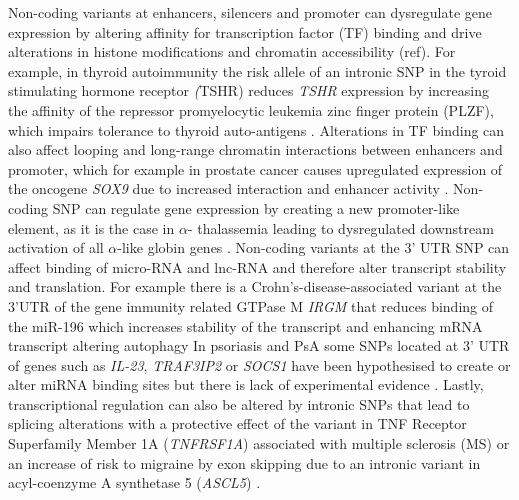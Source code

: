 Non-coding variants at enhancers, silencers and promoter can dysregulate gene expression by altering affinity for transcription factor (TF) binding  and drive alterations in histone modifications and chromatin accessibility (ref). For example, in thyroid autoimmunity the risk allele of an intronic SNP in the tyroid stimulating hormone receptor \textit(TSHR) reduces \textit{TSHR} expression by increasing the affinity of the repressor promyelocytic leukemia zinc finger protein (PLZF), which impairs tolerance to thyroid auto-antigens \parencite{Stefan2014}. Alterations in TF binding can also affect looping and long-range chromatin interactions between enhancers and promoter, which for example in prostate cancer causes upregulated expression of the oncogene \textit{SOX9} due to increased interaction and enhancer activity \parencite{Zhang2012}. Non-coding SNP can regulate gene expression by creating a new promoter-like element, as it is the case in $\alpha$- thalassemia leading to  dysregulated downstream activation of all $\alpha$-like globin genes \parencite{Gobbi2006}. 
Non-coding variants at the 3' UTR SNP can affect binding of micro-RNA and lnc-RNA and therefore alter transcript stability and translation. For example  there is a Crohn’s-disease-associated variant at the 3'UTR of the gene immunity related GTPase M \textit{IRGM} that reduces binding of the miR-196 which increases stability of the transcript and enhancing mRNA transcript altering autophagy \parencite{Brest2011}
In psoriasis and PsA some SNPs located at 3' UTR of genes such as \textit{IL-23}, \textit{TRAF3IP2} or \textit{SOCS1} have been hypothesised to create or alter miRNA binding sites but there is lack of experimental evidence \parencite{Pivarcsi2014}. Lastly, transcriptional regulation can also be altered by intronic SNPs that lead to splicing alterations with a protective effect of the variant in TNF Receptor Superfamily Member 1A (\textit{TNFRSF1A}) associated with multiple sclerosis (MS) \parencite{Gregory2012} or an increase of risk to migraine by exon skipping due to an intronic variant in acyl-coenzyme A synthetase 5 (\textit{ASCL5}) \parencite{Matesanz2016}.

